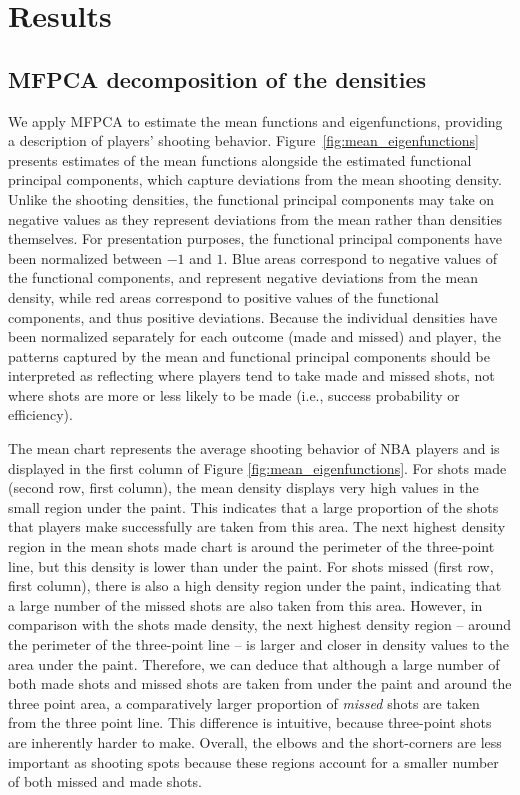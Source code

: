 \section{Results} %
\label{sec:results}

\subsection{MFPCA decomposition of the densities}
\label{sub:decomposition_of_the_densities}

We apply MFPCA to estimate the mean functions and eigenfunctions, providing a description of players' shooting behavior.
Figure~\ref{fig:mean_eigenfunctions} presents estimates of the mean functions alongside the estimated functional principal components, which capture deviations from the mean shooting density.
Unlike the shooting densities, the functional principal components may take on negative values as they represent deviations from the mean rather than densities themselves. For presentation purposes, the functional principal components have been normalized between $-1$ and $1$. Blue areas correspond to negative values of the functional components, and represent negative deviations from the mean density, while red areas correspond to positive values of the functional components, and thus positive deviations.
	Because the individual densities have been normalized separately for each outcome (made and missed) and player, the patterns captured by the mean and functional principal components should be interpreted as reflecting where players tend to take made and missed shots, not where shots are more or less likely to be made (i.e., success probability or efficiency).


	The mean chart represents the average shooting behavior of NBA players and is displayed in the first column of Figure \ref{fig:mean_eigenfunctions}.
		For shots made (second row, first column), the mean density displays very high values in the small region under the paint.
		This indicates that a large proportion of the shots that players make successfully are taken from this area.
		The next highest density region in the mean shots made chart is around the perimeter of the three-point line, but this density is lower than under the paint.
		For shots missed (first row, first column), there is also a high density region under the paint, indicating that a large number of the missed shots are also taken from this area.
		However, in comparison with the shots made density, the next highest density region -- around the perimeter of the three-point line -- is larger and closer in density values to the area under the paint.
		Therefore, we can deduce that although a large number of both made shots and missed shots are taken from under the paint and around the three point area, a comparatively larger proportion of \emph{missed} shots are taken from the three point line.
		This difference is intuitive, because three-point shots are inherently harder to make. Overall, the elbows and the short-corners are less important as shooting spots because these regions account for a smaller number of both missed and made shots.

